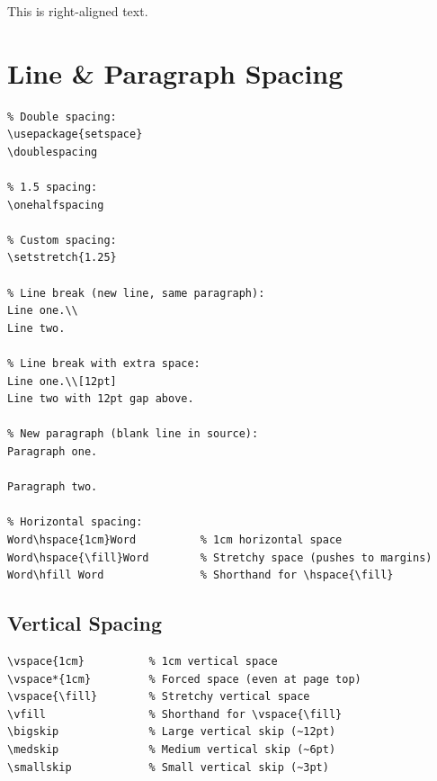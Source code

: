 \begin{flushright}
    This is right-aligned text.
\end{flushright}

\section{Line \& Paragraph Spacing}

\begin{lstlisting}[language={[LaTeX]TeX}, caption=Line spacing]
% Single spacing (default)
% Double spacing:
\usepackage{setspace}
\doublespacing

% 1.5 spacing:
\onehalfspacing

% Custom spacing:
\setstretch{1.25}

% Line break (new line, same paragraph):
Line one.\\
Line two.

% Line break with extra space:
Line one.\\[12pt]
Line two with 12pt gap above.

% New paragraph (blank line in source):
Paragraph one.

Paragraph two.

% Horizontal spacing:
Word\hspace{1cm}Word          % 1cm horizontal space
Word\hspace{\fill}Word        % Stretchy space (pushes to margins)
Word\hfill Word               % Shorthand for \hspace{\fill}
\end{lstlisting}

\subsection{Vertical Spacing}

\begin{lstlisting}[language={[LaTeX]TeX}, caption=Vertical spacing]
\vspace{1cm}          % 1cm vertical space
\vspace*{1cm}         % Forced space (even at page top)
\vspace{\fill}        % Stretchy vertical space
\vfill                % Shorthand for \vspace{\fill}
\bigskip              % Large vertical skip (~12pt)
\medskip              % Medium vertical skip (~6pt)
\smallskip            % Small vertical skip (~3pt)
\end{lstlisting}


